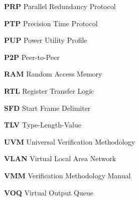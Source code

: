 \textbf{PRP} \hspace{1.1cm} Parallel Redundancy Protocol \par
\textbf{PTP} \hspace{1.15cm} Precision Time Protocol \par
\textbf{PUP} \hspace{1.12cm} Power Utility Profile \par
\textbf{P2P} \hspace{1.15cm} Peer-to-Peer \par
\textbf{RAM} \hspace{1.02cm} Random Access Memory \par
\textbf{RTL} \hspace{1.15cm} Register Transfer Logic \par
    \iffalse
    \textbf{SAS} \hspace{1.1cm} Substation Automation System \par
    \textbf{SCADA} \hspace{0.56cm} Supervisory Control and Data Acquisition \par
    \fi
\textbf{SFD} \hspace{1.1cm} Start Frame Delimiter \par
\textbf{TLV} \hspace{1.15cm} Type-Length-Value \par
    \iffalse
    \textbf{TCP/IP} \hspace{0.65cm} Transmission Control Protocol/Internet Protocol \par
    \fi
\textbf{UVM} \hspace{1.05cm} Universal Verification Methodology \par
\textbf{VLAN} \hspace{0.85cm} Virtual Local Area Network \par
\textbf{VMM} \hspace{1.01cm} Verification Methodology Manual \par
\textbf{VOQ} \hspace{1.05cm} Virtual Output Queue \par
